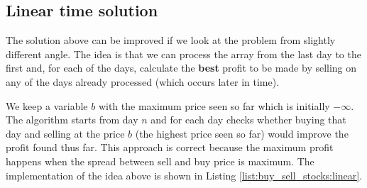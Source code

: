 \subsection{Linear time solution}
\label{buy_sell_stocks:sec:linear}
The solution above can be improved if we look at the problem from slightly different angle. The idea is that we can process the array from the last day to the first and, for each of the days, calculate the \textbf{best} profit to be made by selling on any of the days already processed (which occurs later in time).

We keep a variable $b$ with the maximum price seen so far which is initially $-\infty$. The algorithm starts from day $n$ and for each day checks whether buying that day and selling at the price $b$ (the highest price seen so far) would improve the profit found thus far. This approach is correct because the maximum profit happens when the spread between sell and buy price is maximum.
The implementation of the idea above is shown in Listing \ref{list:buy_sell_stocks:linear}.




